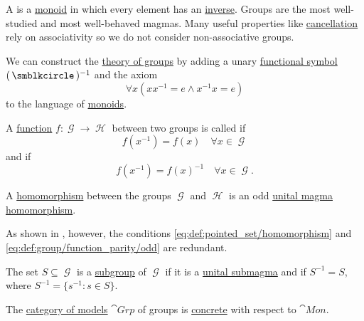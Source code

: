 \begin{definition}\label{def:group}
  A  is a \hyperref[def:unital_magma/associative]{monoid} in which every element has an \hyperref[def:unital_magma_inverse_element]{inverse}. Groups are the most well-studied and most well-behaved magmas. Many useful properties like \hyperref[thm:group_properties/cancellative]{cancellation} rely on associativity so we do not consider non-associative groups.

  \begin{thmenum}
     We can construct the \hyperref[def:first_order_theory]{theory of groups} by adding a unary \hyperref[def:first_order_language/func]{functional symbol} \( (\placeholder)^{-1} \) and the axiom
    \begin{equation}\label{eq:def:group/theory/inverse_axiom}
      \forall x (xx^{-1} = e \wedge x^{-1}x = e)
    \end{equation}
    to the language of \hyperref[def:unital_magma/associative]{monoids}.

     A \hyperref[def:function/single_valued]{function} \( f: \mscrG \to \mscrH \) between two groups is called  if
    \begin{equation}\label{eq:def:group/function_parity/even}
      f(x^{-1}) = f(x) \quad\forall x \in \mscrG
    \end{equation}
    and  if
    \begin{equation}\label{eq:def:group/function_parity/odd}
      f(x^{-1}) = f(x)^{-1} \quad\forall x \in \mscrG.
    \end{equation}

     A \hyperref[def:first_order_homomorphism]{homomorphism} between the groups \( \mscrG \) and \( \mscrH \) is an odd \hyperref[def:unital_magma/homomorphism]{unital magma homomorphism}.

    As shown in , however, the conditions \eqref{eq:def:pointed_set/homomorphism} and \eqref{eq:def:group/function_parity/odd} are redundant.

     The set \( S \subseteq \mscrG \) is a \hyperref[def:first_order_substructure]{subgroup} of \( \mscrG \) if it is a \hyperref[def:unital_magma/substructure]{unital submagma} and if \( S^{-1} = S \), where \( S^{-1} = \{ s^{-1} \colon s \in S \} \).

     The \hyperref[def:category_of_first_order_models]{category of models} \( \cat{Grp} \) of groups is \hyperref[def:concrete_category]{concrete} with respect to \hyperref[def:unital_magma/associative]{\( \cat{Mon} \)}.


\end{thmenum}
\end{definition}
